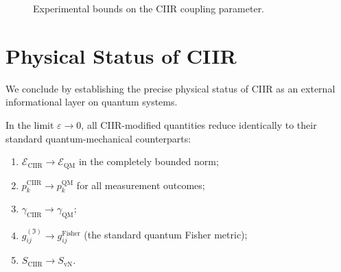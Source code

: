 \begin{figure}[t]
\centering
{}
\caption{Experimental bounds on the CIIR coupling parameter.}
\label{fig:c10:experiments}
\end{figure}

\section{Physical Status of CIIR}
\label{sec:ch10:status}

We conclude by establishing the precise physical status of CIIR as an
external informational layer on quantum systems.

\begin{theorem}
\label{thm:10.13}
In the limit $\varepsilon\to 0$, all CIIR-modified quantities reduce
identically to their standard quantum-mechanical counterparts:
\begin{enumerate}
  \item $\mathcal{E}_{\mathrm{CIIR}}\to\mathcal{E}_{\mathrm{QM}}$
        in the completely bounded norm;
  \item $p_k^{\mathrm{CIIR}}\to p_k^{\mathrm{QM}}$ for all
        measurement outcomes;
  \item $\gamma_{\mathrm{CIIR}}\to\gamma_{\mathrm{QM}}$;
  \item $g_{ij}^{(\mathfrak{I})}\to g_{ij}^{\mathrm{Fisher}}$
        (the standard quantum Fisher metric);
  \item $S_{\mathrm{CIIR}}\to S_{\mathrm{vN}}$.
\end{enumerate}
\end{theorem}

